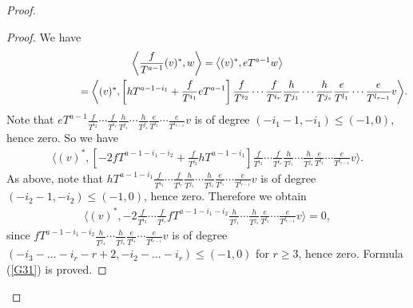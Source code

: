 \documentclass[11pt]{article}
\numberwithin{equation}{section}
\begin{document}
\begin{proof}
\begin{proof}We have
\begin{gather*}
 \bigg\langle \frac{f}{T^{a-1}} (v)^*, w \bigg\rangle = \big\langle (v)^*, eT^{a-1} w \big\rangle \\
\hphantom{\bigg\langle \frac{f}{T^{a-1}} (v)^*, w \bigg\rangle} = \bigg\langle (v)^*, \left[hT^{a-1-i_1} +\frac{f}{T^{i_1}} eT^{a-1}\right]
 \frac{f}{T^{i_2}} \cdots \frac{f}{T^{i_r}} \frac{h}{T^{j_1}}\cdots\frac{h}{T^{j_s}} \frac{e}{T^{l_1}}\cdots\frac{e}{T^{l_{r-1}}} v \bigg\rangle.
\end{gather*}
Note that $eT^{a-1} \frac{f}{T^{i_2}} \cdots \frac{f}{T^{i_r}} \frac{h}{T^{j_1}}\cdots\frac{h}{T^{j_s}} \frac{e}{T^{l_1}}\cdots\frac{e}{T^{l_{r-1}}} v $ is of degree $(-i_1 - 1,-i_1) \leq (-1,0)$, hence zero. So we have
\begin{gather*}
\bigg\langle (v)^*, \left[-2 fT^{a-1-i_1-i_2} +\frac{f}{T^{i_2}} hT^{a-1-i_1} \right]
\frac{f}{T^{i_3}} \cdots \frac{f}{T^{i_r}} \frac{h}{T^{j_1}}\cdots
\frac{h}{T^{j_s}} \frac{e}{T^{l_1}}\cdots\frac{e}{T^{l_{r-1}}} v \bigg\rangle.
\end{gather*}
As above, note that $hT^{a-1-i_1} \frac{f}{T^{i_3}} \cdots \frac{f}{T^{i_r}} \frac{h}{T^{j_1}}\cdots\frac{h}{T^{j_s}} \frac{e}{T^{l_1}}\cdots\frac{e}{T^{l_{r-1}}} v $ is of degree $ (-i_2-1, -i_2) \leq (-1,0)$, hence zero. Therefore we obtain
\begin{gather*}
\bigg\langle (v)^*, -2 \frac{f}{T^{i_3}} \cdots \frac{f}{T^{i_r}} fT^{a-1-i_1-i_2} \frac{h}{T^{j_1}}\cdots\frac{h}{T^{j_s}} \frac{e}{T^{l_1}}\cdots\frac{e}{T^{l_{r-1}}} v \bigg\rangle = 0,
\end{gather*}
since $fT^{a-1-i_1-i_2} \frac{h}{T^{j_1}}\cdots\frac{h}{T^{j_s}} \frac{e}{T^{l_1}}\cdots\frac{e}{T^{l_{r-1}}} v $ is of degree $(-i_3 - \dots - i_r - r + 2, -i_2 - \dots - i_r) \leq (-1,0)$ for $r \geq 3$, hence zero. Formula (\ref{G31}) is proved.


\end{proof}
\end{proof}
\end{document}
